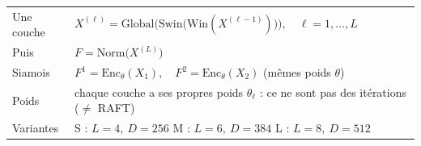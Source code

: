 \documentclass[border=8pt,varwidth=480pt]{standalone}
\begin{document}
\fontsize{13}{16}\selectfont
\begin{tabular}{@{}>{\raggedright\arraybackslash}p{92pt} >{\raggedright\arraybackslash}p{370pt}@{}}
Une couche & $X^{(\ell)} = \mathrm{Global}\Big(\mathrm{Swin}\big(\mathrm{Win}(X^{(\ell-1)})\big)\Big), \quad \ell = 1, \dots, L$ \\
Puis & $F = \mathrm{Norm}\big(X^{(L)}\big)$ \\
Siamois & $F^1 = \mathrm{Enc}_\theta(X_1), \quad F^2 = \mathrm{Enc}_\theta(X_2)$ \quad (mêmes poids $\theta$) \\
Poids & chaque couche a ses propres poids $\theta_\ell$ : \newline ce ne sont pas des itérations ($\neq$ RAFT) \\
Variantes & S : $L = 4,\ D = 256$ \quad M : $L = 6,\ D = 384$ \quad L : $L = 8,\ D = 512$ \\
\end{tabular}
\end{document}
